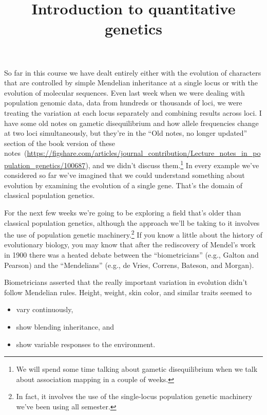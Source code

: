 \documentclass[12pt]{article}
\title{Introduction to quantitative genetics}
\begin{document}
\maketitle

\thispagestyle{first}

So far in this course we have dealt entirely either with the evolution
of characters that are controlled by simple Mendelian inheritance at a
single locus or with the evolution of molecular sequences. Even last
week when we were dealing with population genomic data, data from
hundreds or thousands of loci, we were treating the variation at each
locus separately and combining results across loci. I have some old
notes on gametic disequilibrium and how allele frequencies change at
two loci simultaneously, but they're in the ``Old notes, no longer
updated'' section of the book version of these
notes~(\url{https://figshare.com/articles/journal_contribution/Lecture_notes_in_population_genetics/100687}),
and we didn't discuss them.\footnote{We will spend some time talking
  about gametic disequilibrium when we talk about association mapping
  in a couple of weeks.} In every example we've considered so far
we've imagined that we could understand something about evolution by
examining the evolution of a single gene. That's the domain of
classical population genetics.

For the next few weeks we're going to be exploring a field that's
older than classical population genetics, although the approach we'll
be taking to it involves the use of population genetic
machinery.\footnote{In fact, it involves the use of the single-locus
  population genetic machinery we've been using all semester.} If you
know a little about the history of evolutionary biology, you may know
that after the rediscovery of Mendel's work in 1900 there was a heated
debate between the ``biometricians'' (e.g., Galton and Pearson) and
the ``Mendelians'' (e.g., de Vries, Correns, Bateson, and
Morgan).

Biometricians asserted that the really important variation in
evolution didn't follow Mendelian rules. Height, weight, skin color,
and similar traits seemed to

\begin{itemize}

\item vary continuously,

\item show blending inheritance, and

\item show variable responses to the environment.

\end{itemize}
\end{document}
